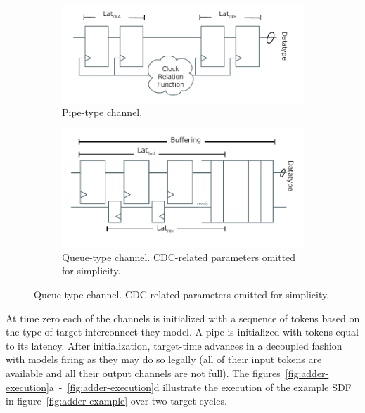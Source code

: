 \begin{figure}
    \centering
    \begin{subfigure}[t]{0.48\textwidth}
        \includegraphics[width=\textwidth]{figures/pipe.pdf}
        \caption{Pipe-type channel.}
        \label{fig:pipe}
    \end{subfigure}\hspace{0.5cm}
    \begin{subfigure}[t]{0.48\textwidth}
        \includegraphics[width=\textwidth]{figures/queue.pdf}
        \caption{Queue-type channel. CDC-related parameters omitted for simplicity.}
        \label{fig:queue}
    \end{subfigure}
\end{figure}

At time zero each of the channels is initialized with a sequence of tokens based
on the type of target interconnect they model. A pipe is initialized with tokens
equal to its latency. After initialization, target-time advances in a decoupled
fashion with models firing as they may do so legally (all of their input tokens
are available and all their output channels are not full). The
figures~\ref{fig:adder-execution}a~-~\ref{fig:adder-execution}d illustrate the
execution of the example SDF in figure~\ref{fig:adder-example} over two target
cycles.

